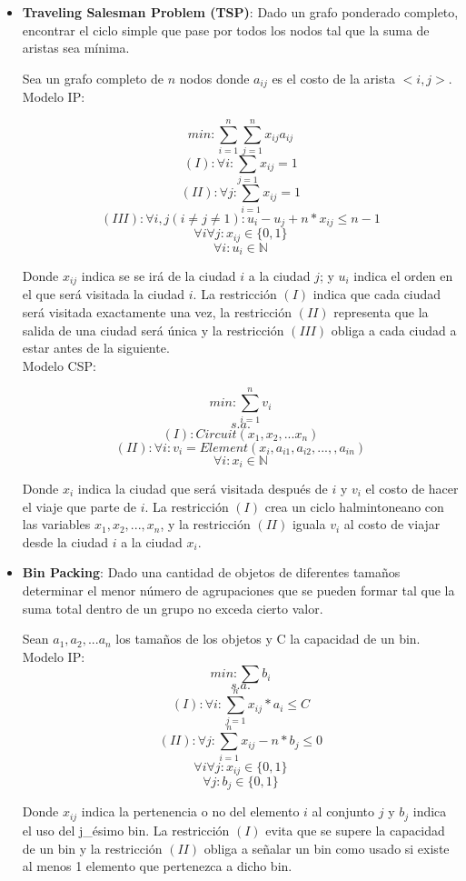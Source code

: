 \documentclass[12pt]{report}
\begin{document}
\begin{itemize}
\item \textbf{Traveling Salesman Problem (TSP)}: Dado un grafo ponderado completo, encontrar el ciclo simple que pase por todos los nodos tal que la suma de aristas sea mínima.

Sea un grafo completo de $n$ nodos donde $a_{ij}$ es el costo de la arista $<i,j>$.\\

Modelo IP:

$$min: \sum_{i=1}^n\sum_{j=1}^n x_{ij}a_{ij}$$
$$(I):\forall i: \sum_{j=1}x_{ij}=1$$
$$(II):\forall j: \sum_{i=1}x_{ij}=1$$
$$(III):\forall i,j (i\neq j\neq1):u_i-u_j+n*x_{ij}\leq n-1$$
$$\forall i\forall j: x_{ij}\in\{0,1\}$$
$$\forall i: u_i\in \mathbb{N}$$

Donde $x_{ij}$ indica se se irá de la ciudad $i$ a la ciudad $j$; y $u_i$ indica el orden en el que será visitada la ciudad $i$. La restricción $(I)$ indica que cada ciudad será visitada exactamente una vez, la restricción $(II)$ representa que la salida de una ciudad será única y la restricción $(III)$ obliga a cada ciudad a estar antes de la siguiente.\\

Modelo CSP:

$$min:\sum_{i=1}^n v_i$$
$$s.a.$$
$$(I):Circuit(x_1,x_2,...x_n)$$
$$(II):\forall i:v_i=Element(x_i,a_{i1},a_{i2},...,,a_{in})$$
$$\forall i: x_i\in \mathbb{N}$$

Donde $x_i$ indica la ciudad que será visitada después de $i$ y $v_i$ el costo de hacer el viaje que parte de $i$. La restricción $(I)$ crea un ciclo halmintoneano con las variables $x_1,x_2,...,x_n$, y la restricción $(II)$ iguala $v_i$ al costo de viajar desde la ciudad $i$ a la ciudad $x_i$.

\item \textbf{Bin Packing}: Dado una cantidad de objetos de diferentes tamaños determinar el menor número de agrupaciones que se pueden formar tal que la suma total dentro de un grupo no exceda cierto valor.

Sean $a_1, a_2,...a_n$ los tamaños de los objetos y C la capacidad de un bin.\\

Modelo IP:
$$min:\sum b_i$$
$$s.a.$$
$$(I): \forall i: \sum_{j=1}^n x_{ij}*a_i\leq C$$
$$(II):\forall j:\sum_{i=1}^n x_{ij} -n*b_j\leq0$$
$$\forall i\forall j: x_{ij}\in\{0,1\}$$
$$\forall j: b_j\in \{0,1\}$$

Donde $x_{ij}$ indica la pertenencia o no del elemento $i$ al conjunto $j$ y $b_j$ indica el uso del j\_ésimo bin. La restricción $(I)$ evita que se supere la capacidad de un bin y la restricción $(II)$ obliga a señalar un bin como usado si existe al menos 1 elemento que pertenezca a dicho bin.\\


\end{itemize}
\end{document}
